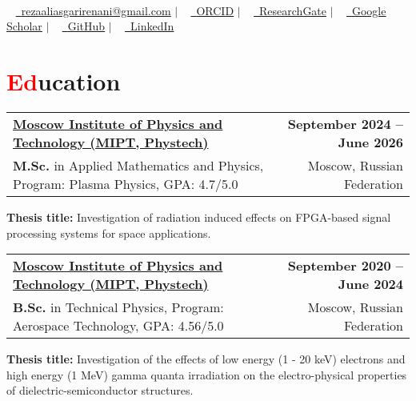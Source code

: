 \documentclass[a4paper, 11pt]{article}
\makeatletter
\newcommand{\resumeItem}[1]{
    \item\small{
        {#1 \vspace{-2pt}}
    }
}
\newcommand{\resumeSubheading}[4]{
    \vspace{-2pt}\item
    \begin{tabular*}{1.0\textwidth}[t]{l@{\extracolsep{\fill}}r}
        \textbf{#1} & \textbf{\small #2} \\
        \small#3 & \small #4
    \end{tabular*}\vspace{-7pt}
}
\newcommand{\resumeSubHeadingListStart}{\begin{itemize}[leftmargin=0.0in, label={}]}
\newcommand{\resumeSubHeadingListEnd}{\end{itemize}}
\makeatother
\begin{document}
\begin{center}
    {\Huge \scshape {\fontsize{25}{30}\selectfont{Reza}} {\fontsize{25}{30}}} \\ \vspace{3pt}
    \small ~ 
    \href{mailto:rezaaliasgarirenani@gmail.com}{\raisebox{-0.2\height}\faEnvelope\ \underline{rezaaliasgarirenani@gmail.com}} $|$ ~
    \href{https://orcid.org/0009-0000-8983-755X}{\raisebox{-0.2\height}\faOrcid\ \underline{ORCID}} $|$ ~
    \href{https://www.researchgate.net/profile/Reza-Aliasgari-Renani}{\raisebox{-0.2\height}\faResearchgate\
    \underline{ResearchGate}} $|$ ~
    \href{https://scholar.google.com/citations?user=L9Vv3C8AAAAJ&hl=en}{\raisebox{-0.2\height}\faGraduationCap\ \underline{Google Scholar}} $|$ ~
    \href{https://github.com/rezaaliasgarirenani}{\raisebox{-0.2\height}\faGithub\ \underline{GitHub}} $|$ ~
    \href{https://linkedin.com/in/reza-aliasgari-renani}{\raisebox{-0.2\height}\faLinkedin\ \underline{LinkedIn}}
    \vspace{-10pt}
\end{center}

\section{\textcolor{red}{Ed}ucation}
\resumeSubHeadingListStart
    \resumeSubheading
        {\href{https://mipt.ru/}{Moscow Institute of Physics and Technology (MIPT, Phystech)}}{September 2024 -- June 2026}
        {\textbf{M.Sc.} in Applied Mathematics and Physics, Program: Plasma Physics, GPA: 4.7/5.0}{Moscow, Russian Federation}
        {\resumeItem{\textbf{Thesis title:} Investigation of radiation induced effects on FPGA-based signal processing systems for space applications.}}
    \resumeSubheading
        {\href{https://mipt.ru/}{Moscow Institute of Physics and Technology (MIPT, Phystech)}}{September 2020 -- June 2024}
        {\textbf{B.Sc.} in Technical Physics, Program: Aerospace Technology, GPA: 4.56/5.0}{Moscow, Russian Federation}
        {\resumeItem{\textbf{Thesis title:} Investigation of the effects of low energy (1 - 20 keV) electrons and high energy (1 MeV) gamma quanta irradiation on the electro-physical properties of dielectric-semiconductor structures.}}
\resumeSubHeadingListEnd
\vspace{-15pt}

\end{document}
